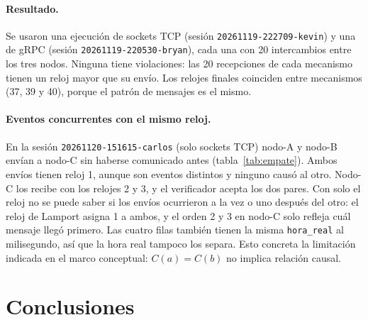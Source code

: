 \documentclass[11pt,a4paper]{article}
\begin{document}
\paragraph{Resultado.} Se usaron una ejecución de sockets TCP (sesión
\texttt{20261119-222709-kevin}) y una de gRPC (sesión \texttt{20261119-220530-bryan}), cada
una con 20 intercambios entre los tres nodos. Ninguna tiene violaciones: las 20
recepciones de cada mecanismo tienen un reloj mayor que su envío. Los relojes finales
coinciden entre mecanismos (37, 39 y 40), porque el patrón de mensajes es el mismo.

\begin{table}[htbp]
  \centering
  \caption{Verificación de Lamport en una ejecución de cada mecanismo.}
  \label{tab:lamport}
  
\end{table}

\paragraph{Eventos concurrentes con el mismo reloj.} En la sesión
\texttt{20261120-151615-carlos} (solo sockets TCP) nodo-A y nodo-B envían a nodo-C sin
haberse comunicado antes (tabla~\ref{tab:empate}). Ambos envíos tienen reloj 1, aunque son
eventos distintos y ninguno causó al otro. Nodo-C los recibe con los relojes 2 y 3, y el
verificador acepta los dos pares. Con solo el reloj no se puede saber si los envíos
ocurrieron a la vez o uno después del otro: el reloj de Lamport asigna 1 a ambos, y el
orden 2 y 3 en nodo-C solo refleja cuál mensaje llegó primero. Las cuatro filas también
tienen la misma \texttt{hora\_real} al milisegundo, así que la hora real tampoco los
separa. Esto concreta la limitación indicada en el marco conceptual: $C(a) = C(b)$ no
implica relación causal.

\begin{table}[htbp]
  \centering
  \caption{Empate de relojes en nodo-A y nodo-B.}
  \label{tab:empate}
  
\end{table}

\section{Conclusiones}
\end{document}
